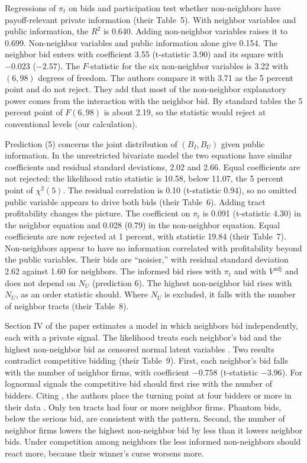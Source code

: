  Regressions of $\pi_t$ on bids and participation test whether non-neighbors
have payoff-relevant private information (their Table~5). With neighbor variables and public information, the
$R^2$ is 0.640. Adding non-neighbor variables raises it to 0.699. Non-neighbor variables and public information
alone give 0.154. The neighbor bid enters with coefficient 3.55 (t-statistic 3.90) and its square with $-0.023$
($-2.57$). The $F$-statistic for the six non-neighbor variables is 3.22 with $(6,98)$ degrees of freedom. The
authors compare it with 3.71 as the 5 percent point and do not reject. They add that most of the non-neighbor
explanatory power comes from the interaction with the neighbor bid. By standard tables the 5 percent point of
$F(6,98)$ is about 2.19, so the statistic would reject at conventional levels (our calculation).

 Prediction (5) concerns the joint distribution of $(B_I,B_U)$ given public
information. In the unrestricted bivariate model the two equations have similar coefficients and residual
standard deviations, 2.02 and 2.66. Equal coefficients are not rejected: the likelihood ratio statistic is 10.58,
below 11.07, the 5 percent point of $\chi^2(5)$. The residual correlation is 0.10 (t-statistic 0.94), so no omitted
public variable appears to drive both bids (their Table~6). Adding tract profitability changes the picture. The
coefficient on $\pi_t$ is 0.091 (t-statistic 4.30) in the neighbor equation and 0.028 (0.79) in the non-neighbor
equation. Equal coefficients are now rejected at 1 percent, with statistic 19.84 (their Table~7). Non-neighbors
appear to have no information correlated with profitability beyond the public variables. Their bids are
``noisier,'' with residual standard deviation 2.62 against 1.60 for neighbors. The informed bid rises with $\pi_t$
and with $V^{\mathrm{adj}}$ and does not depend on $N_U$ (prediction 6). The highest non-neighbor bid rises with
$N_U$, as an order statistic should. Where $N_U$ is excluded, it falls with the number of neighbor tracts
(their Table~8).

 Section IV of the paper estimates a model in which neighbors bid
independently, each with a private signal. The likelihood treats each neighbor's bid and the highest non-neighbor
bid as censored normal latent variables \citep[p.~880]{HendricksPorter1988}. Two results contradict competitive
bidding (their Table~9). First, each neighbor's bid falls with the number of neighbor firms, with coefficient
$-0.758$ (t-statistic $-3.96$). For lognormal signals the competitive bid should first rise with the number of
bidders. Citing \citet{Smiley1979}, the authors place the turning point at four bidders or more in their data
\citep[p.~880]{HendricksPorter1988}. Only ten tracts had four or more neighbor firms. Phantom bids, below the serious bid, are consistent with the pattern. Second, the number of
neighbor firms lowers the highest non-neighbor bid by less than it lowers neighbor bids. Under competition among
neighbors the less informed non-neighbors should react more, because their winner's curse worsens more.

